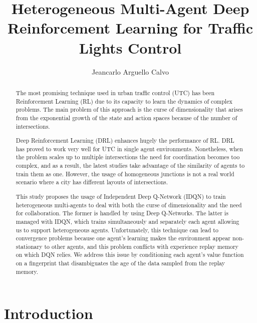 \documentclass{llncs}
\title{Heterogeneous Multi-Agent Deep Reinforcement Learning for Traffic Lights Control}
\author{Jeancarlo Arguello Calvo}
\institute{School of Computer Science and Statistics, University of Dublin, Trinity College \\
\email{arguellj@tcd.ie} }
\begin{document}
\maketitle

\begin{abstract}
The most promising technique used in urban traffic control (UTC) has been Reinforcement Learning (RL) due to its capacity to learn the dynamics of complex problems. The main problem of this approach is the curse of dimensionality that arises from the exponential growth of the state and action spaces because of the number of intersections.
	
	Deep Reinforcement Learning (DRL) enhances hugely the performance of RL. DRL has proved to work very well for UTC in single agent environments. Nonetheless, when the problem scales up to multiple intersections the need for coordination becomes too complex, and as a result, the latest studies take advantage of the similarity of agents to train them as one. However, the usage of homogeneous junctions is not a real world scenario where a city has different layouts of intersections.
	
	This study proposes the usage of Independent Deep Q-Network (IDQN) to train heterogeneous multi-agents to deal with both the curse of dimensionality and the need for collaboration. The former is handled by using Deep Q-Networks. The latter is managed with IDQN, which trains simultaneously and separately each agent allowing us to support heterogeneous agents. Unfortunately, this technique can lead to convergence problems because one agent's learning makes the environment appear non-stationary to other agents, and this problem conflicts with experience replay memory on which DQN relies. We address this issue by conditioning each agent's value function on a fingerprint that disambiguates the age of the data sampled from the replay memory.
\end{abstract}

\section{Introduction}
\end{document}
